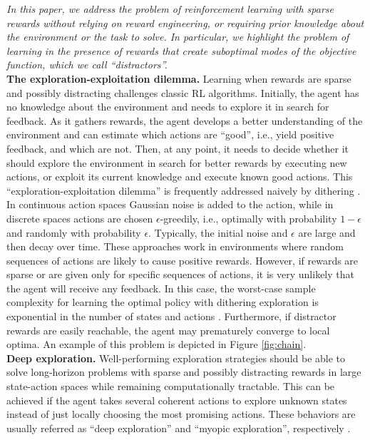 \documentclass{article}
\begin{document}
\textit{In this paper, we address the problem of reinforcement learning with \textit{sparse} rewards without relying on reward engineering, or requiring prior knowledge about the environment or the task to solve. In particular, we highlight the problem of learning in the presence of rewards that create suboptimal modes of the objective function, which we call ``distractors''.}
\\[5pt]
\textbf{The exploration-exploitation dilemma.} Learning when rewards are sparse and possibly distracting challenges classic RL algorithms. Initially, the agent has no knowledge about the environment and needs to explore it in search for feedback. As it gathers rewards, the agent develops a better understanding of the environment and can estimate which actions are ``good'', i.e., yield positive feedback, and which are not.
Then, at any point, it needs to decide whether it should explore the environment in search for better rewards by executing new actions, or exploit its current knowledge and execute known good actions.
This ``exploration-exploitation dilemma'' is frequently addressed naively by dithering \citep{mnih2013playing, lillicrap2015continuous}. In continuous action spaces Gaussian noise is added to the action, while in discrete spaces actions are chosen $\epsilon$-greedily, i.e., optimally with probability $1\! -\! \epsilon$ and randomly with probability $\epsilon$. Typically, the initial noise and $\epsilon$ are large and then decay over time. 
These approaches work in environments where random sequences of actions are likely to cause positive rewards. However, if rewards are sparse or are given only for specific sequences of actions, it is very unlikely that the agent will receive any feedback. In this case, the worst-case sample complexity for learning the optimal policy with dithering exploration is exponential in the number of states and actions \citep{kakade2003sample, szepesvari2010algorithms, osband2016generalization}. Furthermore, if distractor rewards are easily reachable, the agent may prematurely converge to local optima. An example of this problem is depicted in Figure \ref{fig:chain}.
\\[5pt]
\textbf{Deep exploration.}
Well-performing exploration strategies should be able to solve long-horizon problems with sparse and possibly distracting rewards in large state-action spaces while remaining computationally tractable. This can be achieved if the agent takes several coherent actions to explore unknown states instead of just locally choosing the most promising actions. These behaviors are usually referred as ``deep exploration'' and ``myopic exploration'', respectively \citep{osband2016deep}.
\end{document}
